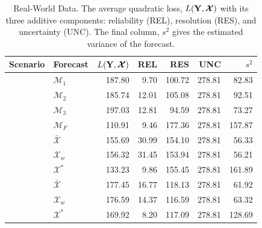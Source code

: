 \documentclass[12pt]{article}
\theoremstyle{definition}
\theoremstyle{definition}
\def\Y{{\bf Y}}
\begin{document}
\begin{table}[t!]
\centering
\caption{Real-World Data. The average quadratic loss, $L(\Y,\boldsymbol{\mathcal{X}} )$ with its three additive components: reliability (REL), resolution (RES), and uncertainty (UNC). The final column, $s^2$ gives the estimated variance of the forecast. } 
\begin{tabular}{llrrrrr}
  \hline \hline
Scenario &  Forecast & $L(\Y,\boldsymbol{\mathcal{X}} )$ & REL & RES & UNC & $s^2$\\ 
  \hline
 &  $\mathcal{M}_1$ & 187.80 & 9.70 & 100.72 & 278.81 & 82.83 \\ 
& $\mathcal{M}_2$  & 185.74 & 12.01 & 105.08 & 278.81 & 92.51 \\ 
  & $\mathcal{M}_3$ & 197.03 & 12.81 & 94.59 & 278.81 & 73.27 \\ 
&$\mathcal{M}_F$  & 110.91 & 9.46 & 177.36 & 278.81 & 157.87 \\ \rule{0pt}{2.9ex} 
\multirow{3}{*}{No Overlap} &  $\bar{\mathcal{X}}$ & 155.69 & 30.99 & 154.10 & 278.81 & 56.33 \\ 
 & $\mathcal{X}_w$ & 156.32 & 31.45 & 153.94 & 278.81 & 56.21 \\ 
  &$\mathcal{X}^*$ & 133.23 & 9.86 & 155.45 & 278.81 & 161.89 \\ \rule{0pt}{2.9ex} 
 \multirow{3}{*}{High Overlap}  & $\bar{\mathcal{X}}$ & 177.45 & 16.77 & 118.13 & 278.81 & 61.92 \\ 
  & $\mathcal{X}_w$ & 176.59 & 14.37 & 116.59 & 278.81 & 63.32 \\ 
 & $\mathcal{X}^*$ & 169.92 & 8.20 & 117.09 & 278.81 & 128.69 \\ 
\hline
\end{tabular}
\label{NoTbl}
\end{table}
\end{document}
